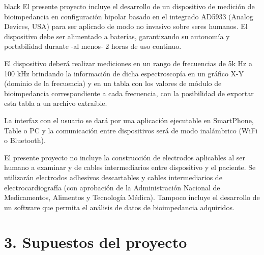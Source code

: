 \documentclass[11pt]{charter}
\begin{document}
\begin{consigna}{black}
El presente proyecto incluye el desarrollo de un dispositivo de medición de bioimpedancia en configuración bipolar basado en el integrado AD5933 (Analog Devices, USA) para ser aplicado de modo no invasivo sobre seres humanos. El dispositivo debe ser alimentado a baterías, garantizando su autonomía y portabilidad durante -al menos- 2 horas de uso continuo.

El dispositivo deberá realizar mediciones en un rango de frecuencias de 5k Hz a 100 kHz brindando la información de dicha espectroscopía en un gráfico X-Y (dominio de la frecuencia) y en un tabla con los valores de módulo de bioimpedancia correspondiente a cada frecuencia, con la posibilidad de exportar esta tabla a un archivo extraíble. 

La interfaz con el usuario se dará por una aplicación ejecutable en SmartPhone, Table o PC y la comunicación entre dispositivos será de modo inalámbrico (WiFi o Bluetooth).

El presente proyecto no incluye la construcción de electrodos aplicables al ser humano a examinar y de cables intermediarios entre dispositivo y el paciente. Se utilizarán electrodos adhesivos descartables y cables intermediarios de electrocardiografía (con aprobación de la Administración Nacional de Medicamentos, Alimentos y Tecnología Médica). Tampoco incluye el desarrollo de un software que permita el análisis de datos de bioimpedancia adquiridos.
\end{consigna}

\pagebreak

\section{3. Supuestos del proyecto}
\label{sec:supuestos}
\end{document}
